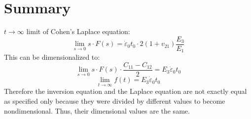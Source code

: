 \documentclass[10pt]{article}
\begin{document}
\section{Summary}
$t \rightarrow \infty$ limit of Cohen's Laplace equation:
$$
\lim _{s \rightarrow 0} s \cdot F(s)=\dot{\varepsilon}_{0} t_{0} \cdot 2\left(1+v_{21}\right) \frac{E_{3}}{E_{1}}
$$
This can be dimensionalized to:
$$
\lim _{s \rightarrow 0} s \cdot F(s) \cdot \frac{C_{11}-C_{12}}{2}=E_{3} \dot{\varepsilon}_{0} t_{0}
$$
$$
\lim _{t \rightarrow \infty} f(t)=E_{3} \dot{\varepsilon}_{0} t_{0}
$$
Therefore the inversion equation and the Laplace equation are not exactly equal as specified only because they were divided by different values to become nondimensional. Thus, their dimensional values are the same.
\end{document}
